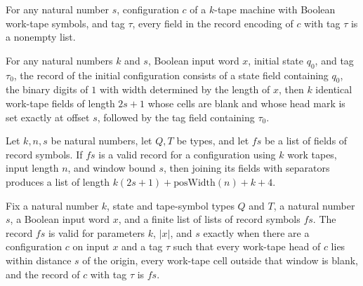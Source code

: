 \begin{theorem}
\label{Turing.cfgRecord_field_ne_nil}
\leanok
{}
For any natural number $s$, configuration $c$ of a $k$-tape machine with Boolean
work-tape symbols, and tag $\tau$, every field in the record encoding of $c$ with tag
$\tau$ is a nonempty list.
\end{theorem}

\begin{theorem}
\label{Turing.cfgRecord_init}
\leanok
{}
For any natural numbers $k$ and $s$, Boolean input word $x$, initial state $q_0$, and
tag $\tau_0$, the record of the initial configuration consists of a state field
containing $q_0$, the binary digits of $1$ with width determined by the length of $x$,
then $k$ identical work-tape fields of length $2s+1$ whose cells are blank and whose
head mark is set exactly at offset $s$, followed by the tag field containing $\tau_0$.
\end{theorem}

\begin{theorem}
\label{Turing.RecordValid.joinFields_length}
\leanok
{}
Let $k,n,s$ be natural numbers, let $Q,T$ be types, and let $fs$ be a list of fields of
record symbols. If $fs$ is a valid record for a configuration using $k$ work tapes,
input length $n$, and window bound $s$, then joining its fields with separators produces
a list of length $k(2s+1)+\text{posWidth}(n)+k+4$.
\end{theorem}

\begin{theorem}
\label{Turing.recordValid_iff_exists_cfg}
\leanok
{}
Fix a natural number $k$, state and tape-symbol types $Q$ and $T$, a natural number $s$,
a Boolean input word $x$, and a finite list of lists of record symbols $fs$. The record
$fs$ is valid for parameters $k$, $|x|$, and $s$ exactly when there are a configuration
$c$ on input $x$ and a tag $\tau$ such that every work-tape head of $c$ lies within
distance $s$ of the origin, every work-tape cell outside that window is blank, and the
record of $c$ with tag $\tau$ is $fs$.
\end{theorem}

